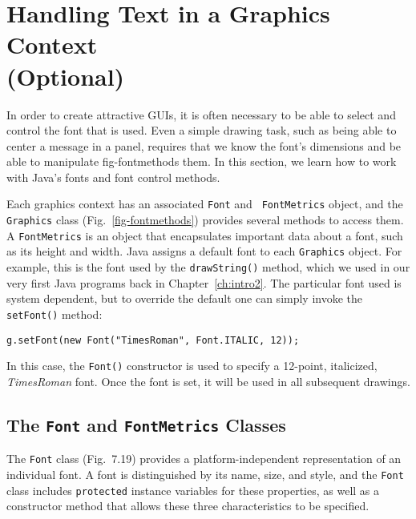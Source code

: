 \section{Handling Text in a Graphics Context \\(Optional)}
\label{handling-textina-graphics-context-optional}


\noindent In order to create attractive GUIs, it is often necessary to
be able to select and control the font that is used.  Even a simple
drawing task, such as being able to center a message in a panel,
requires that we know the font's dimensions and be able to manipulate
{fig-fontmethods}
them.  In this section, we learn how to work with Java's fonts and
font control methods.

Each graphics context has an associated {\tt Font} and {\tt
FontMetrics} object, and the {\tt Graphics} class
(Fig.~\ref{fig-fontmethods}) provides several methods to access them.
A {\tt FontMetrics} is an object that encapsulates important data
about a font, such as its height and width.  Java assigns a default
font to each {\tt Graphics} object.  For example, this is the font
used by the {\tt drawString()} method, which we used in our very first
Java programs back in Chapter~\ref{ch:intro2}.  The particular font used is system
dependent, but to override the default one can simply invoke the {\tt
setFont()} method:

\begin{jjjlisting}
\begin{lstlisting}
g.setFont(new Font("TimesRoman", Font.ITALIC, 12));
\end{lstlisting}
\end{jjjlisting}

\noindent In this case, the {\tt Font()} constructor is used
to specify a 12-point, italicized, {\it TimesRoman} font.  Once the
font is set, it will be used in all subsequent drawings.

\subsection{The {\tt Font} and {\tt FontMetrics} Classes}
\noindent The {\tt Font} class (Fig.~7.19) provides a
platform-independent representation of an individual font.  A font is
distinguished by its name, size, and style, and the {\tt Font} class
includes {\tt protected} instance variables for these properties, as
well as a constructor method that allows these three characteristics
to be specified. 


